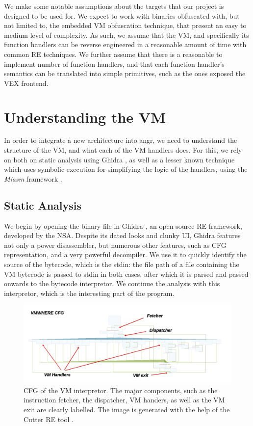 We make some notable assumptions about the targets that our project is designed to be used for. We expect to work with binaries obfuscated with, but not limited to, the embedded \gls{VM} obfuscation technique, that present an easy to medium level of complexity. As such, we assume that the \gls{VM}, and specifically its function handlers can be reverse engineered in a reasonable amount of time with common \gls{RE} techniques. We further assume that there is a reasonable to implement number of function handlers, and that each function handler's semantics can be translated into simple primitives, such as the ones exposed the  VEX frontend.

\section{Understanding the VM}

In order to integrate a new architecture into angr, we need to understand the structure of the \gls{VM}, and what each of the \gls{VM} handlers does. For this, we rely on both on static analysis using Ghidra \cite{ghidra}, as well as a lesser known technique which uses symbolic execution for simplifying the logic of the handlers, using the \emph{Miasm} framework \cite{miasm}.

\subsection{Static Analysis}
\label{static_ghidra}

We begin by opening the binary file in Ghidra \cite{ghidra}, an open source \gls{RE} framework, developed by the \gls{NSA}. Despite its dated looks and clunky \gls{UI}, Ghidra features not only a power disassembler, but numerous other features, such as \gls{CFG} representation, and a very powerful decompiler. We use it to quickly identify the source of the bytecode, which is the \gls{stdin}: the file path of a file containing the \gls{VM} bytecode is passed to \gls{stdin} in both cases, after which it is parsed and passed onwards to the bytecode interpretor. We continue the analysis with this interpretor, which is the interesting part of the program.

\begin{figure}[h]
    \centering
    \includegraphics[width=\textwidth]{./images/cfg_vmwhere}
    \caption{\gls{CFG} of the  \gls{VM} interpretor. The major components, such as the instruction fetcher, the dispatcher, \gls{VM} handers, as well as the \gls{VM} exit are clearly labelled. The image is generated with the help of the Cutter \gls{RE} tool \cite{cutter}.}
    \label{fig:cfg_vmwhere}
\end{figure}

